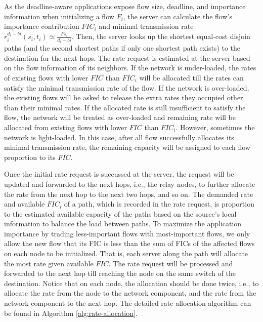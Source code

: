 \documentclass[conference]{IEEEtran}
\begin{document}
As the deadline-aware applications expose flow size, deadline, and importance information when initializing a flow $F_{i}$, the server can calculate the flow's importance contribution $FIC_{i}$ and minimal transmission rate $r_{i}^{d_{i}-b{i}}(s_{i},t_{i})\simeq\frac{Fs_{i}}{d_{i}-b{i}}$. Then, the server looks up the shortest equal-cost disjoin paths (and the second shortest paths if only one shortest path exists) to the destination for the next hops. The rate request is estimated at the server based on the flow information of its neighbors. If the network is under-loaded, the rates of existing flows with lower $FIC$ than $FIC_{i}$ will be allocated till the rates can satisfy the minimal transmission rate of the flow. If the network is over-loaded, the existing flows will be asked to release the extra rates they occupied other than their minimal rates. If the allocated rate is still insufficient to satisfy the flow, the network will be treated as over-loaded and remaining rate will be allocated from existing flows with lower $FIC$ than $FIC_{i}$. However, sometimes the network is light-loaded. In this case, after all flow successfully allocates its minimal transmission rate, the remaining capacity will be assigned to each flow proportion to its $FIC$.

Once the initial rate request is succussed at the server, the request will be updated and forwarded to the next hops, i.e., the relay nodes, to further allocate the rate from the next hop to the next two hops, and so on. The demanded rate and available $FIC_{i}$ of a path, which is recorded in the rate request, is proportion to the estimated available capacity of the paths based on the source's local information to balance the load between paths. To maximize the application importance by trading less-important flows with most-important flows, we only allow the new flow that its FIC is less than the sum of FICs of the affected flows on each node to be initialized. That is, each server along the path will allocate the most rate given available $FIC$. The rate request will be processed and forwarded to the next hop till reaching the node on the same switch of the destination. Notice that on each node, the allocation should be done twice, i.e., to allocate the rate from the node to the network component, and the rate from the network component to the next hop. The detailed rate allocation algorithm can be found in Algorithm \ref{alg:rate-allocation}.
\end{document}
